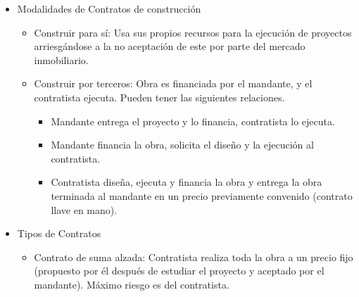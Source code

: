 \documentclass{article} %
\begin{document}
\begin{itemize}[label={},left=0pt,align=parleft]
    \item \begin{highlightbox}[levelone] Modalidades de Contratos de construcción \end{highlightbox}
    \begin{itemize}[label={},left=1em,align=parleft]
        \item \begin{highlightbox}[leveltwo] Construir para sí: Usa sus propios recursos para la ejecución de proyectos arriesgándose a la no aceptación de este por parte del mercado inmobiliario. \end{highlightbox}
        \item \begin{highlightbox}[leveltwo] Construir por terceros: Obra es financiada por el mandante, y el contratista ejecuta. Pueden tener las siguientes relaciones. \end{highlightbox}
        \begin{itemize}[label={},left=2em,align=parleft]
            \item \begin{highlightbox}[levelthree] Mandante entrega el proyecto y lo financia, contratista lo ejecuta. \end{highlightbox}
            \item \begin{highlightbox}[levelthree] Mandante financia la obra, solicita el diseño y la ejecución al contratista. \end{highlightbox}
            \item \begin{highlightbox}[levelthree] Contratista diseña, ejecuta y financia la obra y entrega la obra terminada al mandante en un precio previamente convenido (contrato llave en mano). \end{highlightbox}
        \end{itemize}
    \end{itemize}
    \item \begin{highlightbox}[levelone] Tipos de Contratos \end{highlightbox}
    \begin{itemize}[label={},left=1em,align=parleft]
        \item \begin{highlightbox}[leveltwo] Contrato de suma alzada: Contratista realiza toda la obra a un precio fijo (propuesto por él después de estudiar el proyecto y aceptado por el mandante). Máximo riesgo es del contratista. \end{highlightbox}

\end{itemize}
\end{itemize}
\end{document}
